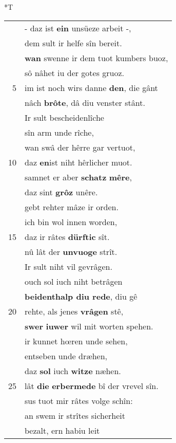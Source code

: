 \documentclass[8pt,a4paper,notitlepage]{article}
\begin{document}
\begin{table}[ht]
\begin{minipage}[t]{0.5\linewidth}
\end{minipage}
\hspace{0.5cm}
\begin{minipage}[t]{0.5\linewidth}
\small
\begin{center}*T
\end{center}
\begin{tabular}{rl}
 & - daz ist \textbf{ein} unsüeze arbeit -,\\ 
 & dem sult ir helfe sîn bereit.\\ 
 & \textbf{wan} swenne ir dem tuot kumbers buoz,\\ 
 & sô nâhet iu der gotes gruoz.\\ 
5 & im ist noch wirs danne \textbf{den}, die gânt\\ 
 & nâch \textbf{brôte}, dâ diu venster stânt.\\ 
 & Ir sult bescheidenlîche\\ 
 & sîn arm unde rîche,\\ 
 & wan swâ der hêrre gar vertuot,\\ 
10 & daz \textbf{en}ist niht hêrlicher muot.\\ 
 & samnet er aber \textbf{schatz} \textbf{mêre},\\ 
 & daz sint \textbf{grôz} unêre.\\ 
 & gebt rehter mâze ir orden.\\ 
 & ich bin wol innen worden,\\ 
15 & daz ir râtes \textbf{dürftic} sît.\\ 
 & nû lât der \textbf{unvuoge} strît.\\ 
 & Ir sult niht vil gevrâgen.\\ 
 & ouch sol iuch niht betrâgen\\ 
 & \textbf{beidenthalp diu rede}, diu gê\\ 
20 & rehte, als jenes \textbf{vrâgen} stê,\\ 
 & \textbf{swer} \textbf{iuwer} wil mit worten spehen.\\ 
 & ir kunnet hœren unde sehen,\\ 
 & entseben unde dræhen,\\ 
 & daz \textbf{sol} iuch \textbf{witze} næhen.\\ 
25 & lât \textbf{die} \textbf{erbermede} bî der vrevel sîn.\\ 
 & sus tuot mir râtes volge schîn:\\ 
 & an swem ir strîtes sicherheit\\ 
 & bezalt, ern habiu leit\\ 

\end{tabular}
\end{minipage}
\end{table}
\end{document}
